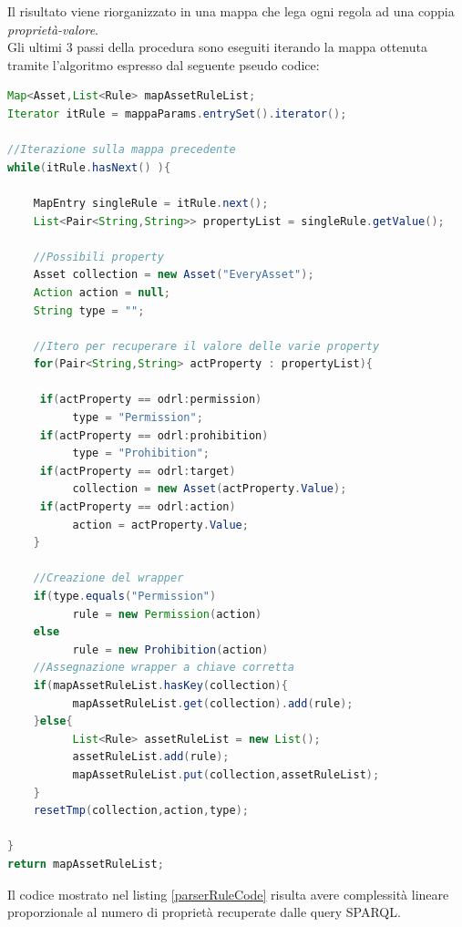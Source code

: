 \documentclass[12pt,a4paper,twoside]{book}
\begin{document}
Il risultato viene riorganizzato in una mappa che lega ogni regola ad una coppia \textit{proprietà-valore}.\\
Gli ultimi 3 passi della procedura sono eseguiti iterando la mappa ottenuta tramite l'algoritmo espresso dal seguente pseudo codice:
\begin{lstlisting}[language=java,firstnumber=1,caption={Pseudo codice per il popolamento della mappa finale},captionpos=b,label=parserRuleCode]
Map<Asset,List<Rule> mapAssetRuleList;
Iterator itRule = mappaParams.entrySet().iterator();

//Iterazione sulla mappa precedente
while(itRule.hasNext() ){

    MapEntry singleRule = itRule.next();
    List<Pair<String,String>> propertyList = singleRule.getValue();
    
    //Possibili property
    Asset collection = new Asset("EveryAsset");
    Action action = null;
    String type = "";
    
    //Itero per recuperare il valore delle varie property
	for(Pair<String,String> actProperty : propertyList){

	 if(actProperty == odrl:permission)
          type = "Permission";
	 if(actProperty == odrl:prohibition)
          type = "Prohibition";
	 if(actProperty == odrl:target)
          collection = new Asset(actProperty.Value);
	 if(actProperty == odrl:action)
	      action = actProperty.Value;
	}
	
    //Creazione del wrapper
    if(type.equals("Permission")
          rule = new Permission(action)
    else
          rule = new Prohibition(action)
    //Assegnazione wrapper a chiave corretta
    if(mapAssetRuleList.hasKey(collection){
          mapAssetRuleList.get(collection).add(rule);     
    }else{
          List<Rule> assetRuleList = new List();
          assetRuleList.add(rule);
          mapAssetRuleList.put(collection,assetRuleList);
    }
    resetTmp(collection,action,type);

}
return mapAssetRuleList;
\end{lstlisting}
Il codice mostrato nel listing \ref{parserRuleCode} risulta avere complessità lineare proporzionale al numero di proprietà recuperate dalle query SPARQL.
\end{document}
